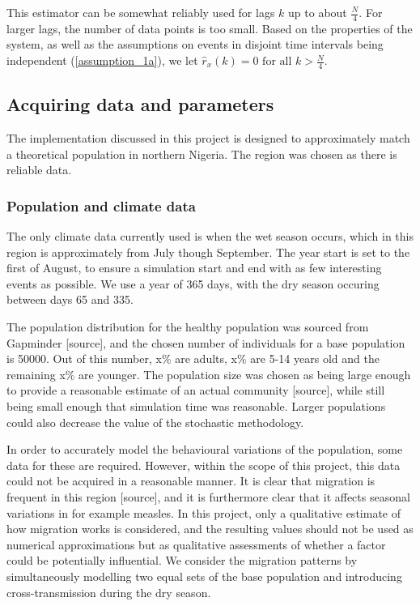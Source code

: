\documentclass[10pt,a4paper]{article}
\begin{document}
This estimator can be somewhat reliably used for lags $k$ up to about $\frac{N}{4}$. For larger lags, the number of data points is too small. Based on the properties of the system, as well as the assumptions on events in disjoint time intervals being independent (\cref{assumption_1a}), we let $\hat{r}_x \left( k \right) = 0 \textrm{ for all } k > \frac{N}{4}$.

\subsection{Acquiring data and parameters}

The implementation discussed in this project is designed to approximately match a theoretical population in northern Nigeria. The region was chosen as there is reliable data.

\subsubsection{Population and climate data}

The only climate data currently used is when the wet season occurs, which in this region is approximately from July though September. The year start is set to the first of August, to ensure a simulation start and end with as few interesting events as possible. We use a year of 365 days, with the dry season occuring between days 65 and 335.

The population distribution for the healthy population was sourced from Gapminder [source], and the chosen number of individuals for a base population is 50000. Out of this number, x\% are adults, x\% are 5-14 years old and the remaining x\% are younger. The population size was chosen as being large enough to provide a reasonable estimate of an actual community [source], while still being small enough that simulation time was reasonable. Larger populations could also decrease the value of the stochastic methodology.



In order to accurately model the behavioural variations of the population, some data for these are required. However, within the scope of this project, this data could not be acquired in a reasonable manner. It is clear that migration is frequent in this region [source], and it is furthermore clear that it affects seasonal variations in for example measles. In this project, only a qualitative estimate of how migration works is considered, and the resulting values should not be used as numerical approximations but as qualitative assessments of whether a factor could be potentially influential. We consider the migration patterns by simultaneously modelling two equal sets of the base population and introducing cross-transmission during the dry season.
\end{document}

